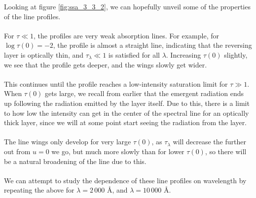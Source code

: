 \documentclass{article}
\begin{document}
Looking at figure \ref{fig:ssa_3_3_2}, we can hopefully unveil some of the properties of the line profiles.\\\\
For $\tau\ll1$, the profiles are very weak absorption lines. For example, for $\log\tau(0) = -2$, the profile is almost a straight line, indicating that the reversing layer is optically thin, and $\tau_{\lambda} \ll 1$ is satisfied for all $\lambda$. Increasing $\tau(0)$ slightly, we see that the profile gets deeper, and the wings slowly get wider.\\\\
This continues until the profile reaches a low-intensity saturation limit for $\tau\gg1$. When $\tau(0)$ gets large, we recall from earlier that the emergent radiation ends up following the radiation emitted by the layer itself. Due to this, there is a limit to how low the intensity can get in the center of the spectral line for an optically thick layer, since we will at some point start seeing the radiation from the layer.\\\\
The line wings only develop for very large $\tau(0)$, as $\tau_{\lambda}$ will decrease the further out from $u=0$ we go, but much more slowly than for lower $\tau(0)$, so there will be a natural broadening of the line due to this.\\\\
We can attempt to study the dependence of these line profiles on wavelength by repeating the above for $\lambda = 2\,000$ Å, and $\lambda = 10\,000$ Å.
\end{document}
